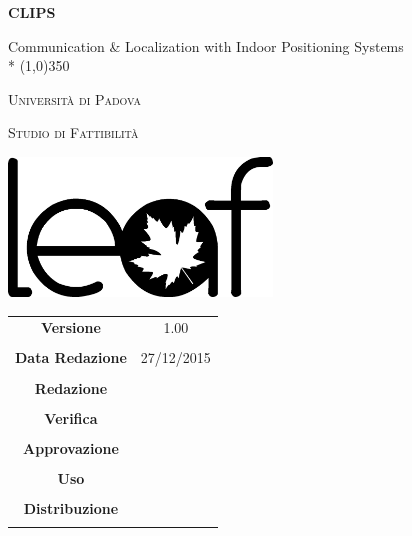 \documentclass{article}
\begin{document}
\pagestyle{myfront}
	\begin{titlepage}
		\centering
		{\huge\bfseries CLIPS\par}
		Communication \& Localization with Indoor Positioning Systems \\*
		\line(1,0){350} \\
		{\scshape\LARGE Università di Padova \par}
		\vspace{1cm}
		{\scshape\Large Studio di Fattibilità\par}
		\vspace{2cm}
		\begin{center}
		{\includegraphics[height=10em]{logoNoSfondo} \par}
		\end{center}
		\vfill \vfill
		\begin{tabular}{c|c}
			{\hfill \textbf{Versione}} & 1.00\\ \\
			{\hfill\textbf{Data Redazione}} & 27/12/2015  \\ \\
			{\hfill\textbf{Redazione}} &  \\ \\
			{\hfill\textbf{Verifica}} &  \\ \\
			{\hfill\textbf{Approvazione}} &  \\ \\
			{\hfill\textbf{Uso}} & \\ \\
			{\hfill\textbf{Distribuzione}} & \\ \\
		\end{tabular}
	\end{titlepage}
	
	\newpage

	\tableofcontents
	
	\label{LastFrontPage}
	
	\newpage
	\pagestyle{mymain}
		
	\newpage
		
	\newpage
		
	\newpage
		
\label{LastPage}
\end{document}
